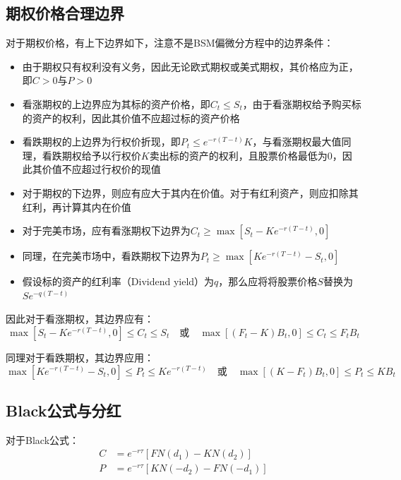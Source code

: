 \documentclass[11pt]{article}
\begin{document}
\subsection{期权价格合理边界}

对于期权价格，有上下边界如下，注意不是BSM偏微分方程中的边界条件：
\begin{itemize}
    \item 由于期权只有权利没有义务，因此无论欧式期权或美式期权，其价格应为正，即$C>0$与$P>0$
    \item 看涨期权的上边界应为其标的资产价格，即$C_t \leq S_t$，由于看涨期权给予购买标的资产的权利，因此其价值不应超过标的资产价格
    \item 看跌期权的上边界为行权价折现，即$P_t \leq e^{-r(T-t)}K$，与看涨期权最大值同理，看跌期权给予以行权价$K$卖出标的资产的权利，且股票价格最低为0，因此其价值不应超过行权价的现值
    \item 对于期权的下边界，则应有应大于其内在价值。对于有红利资产，则应扣除其红利，再计算其内在价值
    \item 对于完美市场，应有看涨期权下边界为$C_t \geq \max \left[ S_t-Ke^{-r(T-t)} , 0 \right]$
    \item 同理，在完美市场中，看跌期权下边界为$P_t \geq \max \left[ Ke^{-r(T-t)} - S_t,0 \right]$
    \item 假设标的资产的红利率（Dividend yield）为$q$，那么应将将股票价格$S$替换为$S e^{-q(T-t)}$
\end{itemize}

因此对于看涨期权，其边界应有：
\begin{equation*}
    \max\left[ S_t - Ke^{-r(T-t)},0 \right] \leq C_t \leq S_t 
    \quad \text{或} \quad
    \max\left[ (F_t - K) B_t,0 \right] \leq C_t \leq F_t B_t
\end{equation*}

同理对于看跌期权，其边界应用：
\begin{equation*}
    \max\left[ Ke^{-r(T-t)} - S_t,0 \right] \leq P_t \leq K e^{-r(T-t)}
    \quad \text{或} \quad
    \max\left[ (K - F_t) B_t,0 \right] \leq P_t \leq K B_t
\end{equation*}

\subsection{Black公式与分红}

对于Black公式：
\begin{align*}
    C &= e^{-r\tau}\left[FN(d_1) - KN(d_2)\right] \\
    P &= e^{-r\tau}\left[KN(-d_2) - FN(-d_1)\right]
\end{align*}
\end{document}
